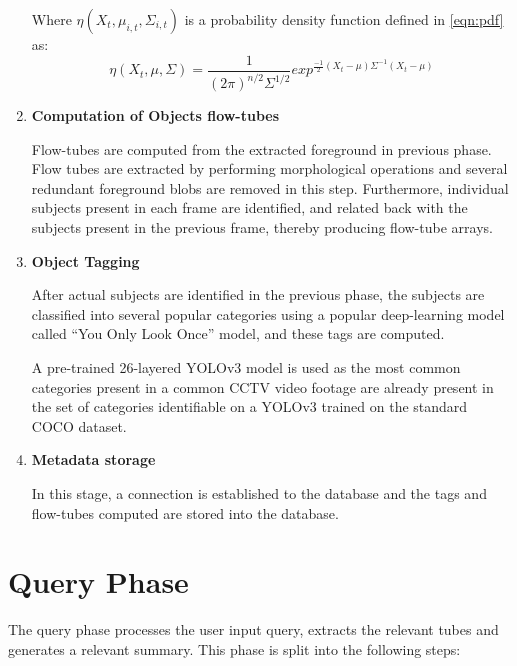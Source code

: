 \begin{enumerate}
    Where \(\eta(X_{t},\mu_{i,t},\Sigma_{i,t})\) is a probability density function
    defined in \ref{eqn:pdf} as:
    \begin{equation}\label{eqn:pdf}
    \eta(X_{t},\mu,\Sigma) = \frac{1}{(2\pi)^{n/2}\Sigma^{1/2}}exp^{\frac{-1}{2}(X_t-\mu)\Sigma^{-1}(X_{t}-\mu)}
    \end{equation}


    \item \textbf{Computation of Objects flow-tubes}

	Flow-tubes are computed from the extracted foreground in previous phase.
    Flow tubes are extracted by performing morphological operations and several
    redundant foreground blobs are removed in this step. Furthermore, individual
    subjects present in each frame are identified, and related back with the
    subjects present in the previous frame, thereby producing flow-tube arrays.

    \item \textbf{Object Tagging}

    After actual subjects are identified in the previous phase, the subjects are
    classified into several popular categories using a popular deep-learning
    model called “You Only Look Once” model, and these tags are computed.

    A pre-trained 26-layered YOLOv3 model is used as the most common categories
    present in a common CCTV video footage are already present in the set of
    categories identifiable on a YOLOv3 trained on the standard COCO dataset.

    \item \textbf{Metadata storage}

    In this stage, a connection is established to the database and the tags and
    flow-tubes computed are stored into the database.
\end{enumerate}

\section{Query Phase}

The query phase processes the user input query, extracts the relevant tubes and
generates a relevant summary. This phase is split into the following steps:


